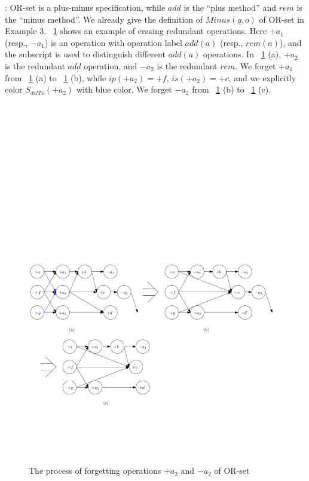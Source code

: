 : OR-set is a plus-minus specification, while $add$ is the ``plus method'' and $rem$ is the ``minus method''. We already give the definition of $Minus(q,o)$ of OR-set in Example 3. \figurename~\ref{fig:the process of penetrate operations of or-set} shows an example of erasing redundant operations. Here $+a_1$ (resp., $-a_1$) is an operation with operation label $add(a)$ (resp., $rem(a)$), and the subscript is used to distinguish different $add(a)$ operations. In \figurename~\ref{fig:the process of penetrate operations of or-set} (a), $+a_2$ is the redundant $add$ operation, and $-a_2$ is the redundant $rem$. We forget $+a_1$ from \figurename~\ref{fig:the process of penetrate operations of or-set} (a) to \figurename~\ref{fig:the process of penetrate operations of or-set} (b), while $ip(+a_2) = +f$, $is(+a_2) = +c$, and we explicitly color $S_{delTo}(+a_2)$ with blue color.  We forget $-a_2$ from \figurename~\ref{fig:the process of penetrate operations of or-set} (b) to \figurename~\ref{fig:the process of penetrate operations of or-set} (c).


\begin{figure}[t]
  \centering
  \includegraphics[width=0.85 \textwidth]{figures/PIC-Example-CompactProcess.pdf}
  \caption{The process of forgetting operations $+a_2$ and $-a_2$ of OR-set}
  \label{fig:the process of penetrate operations of or-set}
\end{figure}

